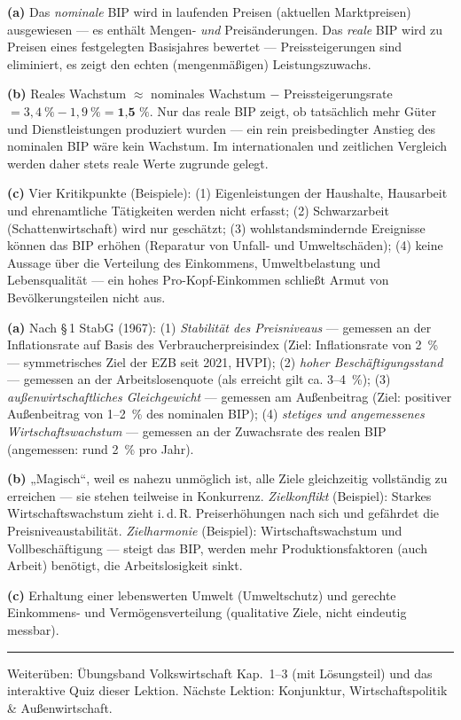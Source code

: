 \documentclass[11pt, a4paper]{article}
\begin{document}
\begin{loesung}[title={Lösung Aufgabe~8 --- Nominales/reales BIP und Grenzen}]
\textbf{(a)} Das \emph{nominale} BIP wird in laufenden Preisen (aktuellen Marktpreisen)
ausgewiesen --- es enthält Mengen- \emph{und} Preisänderungen. Das \emph{reale} BIP wird
zu Preisen eines festgelegten Basisjahres bewertet --- Preissteigerungen sind eliminiert,
es zeigt den echten (mengenmäßigen) Leistungszuwachs.

\textbf{(b)} Reales Wachstum $\approx$ nominales Wachstum $-$ Preissteigerungsrate
$= 3{,}4~\% - 1{,}9~\% = \textbf{1{,}5~\%}$. Nur das reale BIP zeigt, ob tatsächlich mehr
Güter und Dienstleistungen produziert wurden --- ein rein preisbedingter Anstieg des
nominalen BIP wäre kein Wachstum. Im internationalen und zeitlichen Vergleich werden
daher stets reale Werte zugrunde gelegt.

\textbf{(c)} Vier Kritikpunkte (Beispiele): (1) Eigenleistungen der Haushalte, Hausarbeit
und ehrenamtliche Tätigkeiten werden nicht erfasst; (2) Schwarzarbeit
(Schattenwirtschaft) wird nur geschätzt; (3) wohlstandsmindernde Ereignisse können das
BIP erhöhen (Reparatur von Unfall- und Umweltschäden); (4) keine Aussage über die
Verteilung des Einkommens, Umweltbelastung und Lebensqualität --- ein hohes
Pro-Kopf-Einkommen schließt Armut von Bevölkerungsteilen nicht aus.
\end{loesung}

\begin{loesung}[title={Lösung Aufgabe~9 --- Magisches Viereck und Verteilungspolitik}]
\textbf{(a)} Nach \S\,1 StabG (1967): (1) \emph{Stabilität des Preisniveaus} ---
gemessen an der Inflationsrate auf Basis des Verbraucherpreisindex (Ziel: Inflationsrate
von 2~\% --- symmetrisches Ziel der EZB seit 2021, HVPI); (2) \emph{hoher Beschäftigungsstand} --- gemessen an der Arbeitslosenquote (als
erreicht gilt ca. 3--4~\%); (3) \emph{außenwirtschaftliches Gleichgewicht} --- gemessen
am Außenbeitrag (Ziel: positiver Außenbeitrag von 1--2~\% des nominalen BIP);
(4) \emph{stetiges und angemessenes Wirtschaftswachstum} --- gemessen an der Zuwachsrate
des realen BIP (angemessen: rund 2~\% pro Jahr).

\textbf{(b)} „Magisch``, weil es nahezu unmöglich ist, alle Ziele gleichzeitig
vollständig zu erreichen --- sie stehen teilweise in Konkurrenz. \emph{Zielkonflikt}
(Beispiel): Starkes Wirtschaftswachstum zieht i.\,d.\,R. Preiserhöhungen nach sich und
gefährdet die Preisniveaustabilität. \emph{Zielharmonie} (Beispiel): Wirtschaftswachstum
und Vollbeschäftigung --- steigt das BIP, werden mehr Produktionsfaktoren (auch Arbeit)
benötigt, die Arbeitslosigkeit sinkt.

\textbf{(c)} Erhaltung einer lebenswerten Umwelt (Umweltschutz) und gerechte
Einkommens- und Vermögensverteilung (qualitative Ziele, nicht eindeutig messbar).
\end{loesung}

\vspace{1em}
\hrule
\vspace{0.8em}
\noindent\textsf{\small Weiterüben: Übungsband Volkswirtschaft Kap.~1--3 (mit Lösungsteil) und das
interaktive Quiz dieser Lektion. Nächste Lektion: Konjunktur, Wirtschaftspolitik \& Außenwirtschaft.}
\end{document}
